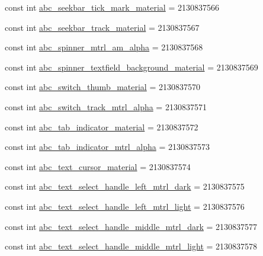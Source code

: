 \begin{CompactItemize}
\item 
const int \hyperlink{class__2doo_1_1_droid_1_1_resource_1_1_drawable_10823f0ac7fe63bf5973ca8ac57d9a02}{abc\_\-seekbar\_\-tick\_\-mark\_\-material} = 2130837566
\item 
const int \hyperlink{class__2doo_1_1_droid_1_1_resource_1_1_drawable_60e755ac635c47c51092c1b2f6c97708}{abc\_\-seekbar\_\-track\_\-material} = 2130837567
\item 
const int \hyperlink{class__2doo_1_1_droid_1_1_resource_1_1_drawable_6398826e356bb7263287c7409a9a3de0}{abc\_\-spinner\_\-mtrl\_\-am\_\-alpha} = 2130837568
\item 
const int \hyperlink{class__2doo_1_1_droid_1_1_resource_1_1_drawable_0cf497a71798ab7828c88c97087afdfd}{abc\_\-spinner\_\-textfield\_\-background\_\-material} = 2130837569
\item 
const int \hyperlink{class__2doo_1_1_droid_1_1_resource_1_1_drawable_9f7387601b3b6ac119acd42286db914f}{abc\_\-switch\_\-thumb\_\-material} = 2130837570
\item 
const int \hyperlink{class__2doo_1_1_droid_1_1_resource_1_1_drawable_b530a15d159f596a62fde520a5bcfc3a}{abc\_\-switch\_\-track\_\-mtrl\_\-alpha} = 2130837571
\item 
const int \hyperlink{class__2doo_1_1_droid_1_1_resource_1_1_drawable_78d0705c86a25b5a0159d73d65d156ea}{abc\_\-tab\_\-indicator\_\-material} = 2130837572
\item 
const int \hyperlink{class__2doo_1_1_droid_1_1_resource_1_1_drawable_235ebba53fb23c138ffe7813a619214d}{abc\_\-tab\_\-indicator\_\-mtrl\_\-alpha} = 2130837573
\item 
const int \hyperlink{class__2doo_1_1_droid_1_1_resource_1_1_drawable_e9eb63baa5e77ec772ea2b88805e0911}{abc\_\-text\_\-cursor\_\-material} = 2130837574
\item 
const int \hyperlink{class__2doo_1_1_droid_1_1_resource_1_1_drawable_f976128f6dac1e272dab0eb8957c7d8e}{abc\_\-text\_\-select\_\-handle\_\-left\_\-mtrl\_\-dark} = 2130837575
\item 
const int \hyperlink{class__2doo_1_1_droid_1_1_resource_1_1_drawable_bee2b958dfe4d47b84e4c4b8b55c4914}{abc\_\-text\_\-select\_\-handle\_\-left\_\-mtrl\_\-light} = 2130837576
\item 
const int \hyperlink{class__2doo_1_1_droid_1_1_resource_1_1_drawable_ec36bd1c467e2ed495d6bd1374c35bc0}{abc\_\-text\_\-select\_\-handle\_\-middle\_\-mtrl\_\-dark} = 2130837577
\item 
const int \hyperlink{class__2doo_1_1_droid_1_1_resource_1_1_drawable_74266ab1052c3d6cd5675c92de29e133}{abc\_\-text\_\-select\_\-handle\_\-middle\_\-mtrl\_\-light} = 2130837578

\end{CompactItemize}
